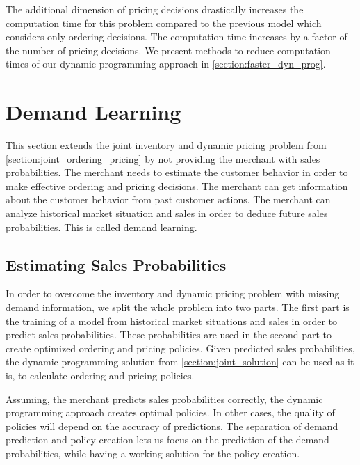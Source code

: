 The additional dimension of pricing decisions drastically increases the computation time for this problem compared to the previous model which considers only ordering decisions.
The computation time increases by a factor of the number of pricing decisions.
We present methods to reduce computation times of our dynamic programming approach in \cref{section:faster_dyn_prog}.



\section{Demand Learning}
\label{section:demand_learning}

This section extends the joint inventory and dynamic pricing problem from \cref{section:joint_ordering_pricing} by not providing the merchant with sales probabilities.
The merchant needs to estimate the customer behavior in order to make effective ordering and pricing decisions.
The merchant can get information about the customer behavior from past customer actions.
The merchant can analyze historical market situation and sales in order to deduce future sales probabilities.
This is called demand learning.



\subsection{Estimating Sales Probabilities}
In order to overcome the inventory and dynamic pricing problem with missing demand information, we split the whole problem into two parts.
The first part is the training of a model from historical market situations and sales in order to predict sales probabilities.
These probabilities are used in the second part to create optimized ordering and pricing policies.
Given predicted sales probabilities, the dynamic programming solution from \cref{section:joint_solution} can be used as it is, to calculate ordering and pricing policies.

Assuming, the merchant predicts sales probabilities correctly, the dynamic programming approach creates optimal policies.
In other cases, the quality of policies will depend on the accuracy of predictions. 
The separation of demand prediction and policy creation lets us focus on the prediction of the demand probabilities, while having a working solution for the policy creation.


